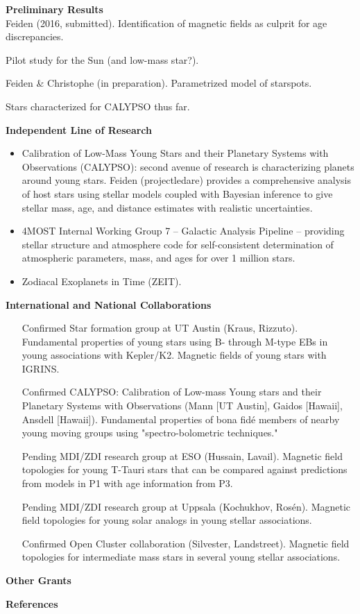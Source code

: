 \documentclass[12pt,a4paper]{article}
\begin{document}
{\bf \large Preliminary Results} \\
Feiden (2016, submitted). Identification of magnetic fields as culprit for age discrepancies.

Pilot study for the Sun (and low-mass star?).

Feiden \& Christophe (in preparation). Parametrized model of starspots.

Stars characterized for CALYPSO thus far.

{\bf \large Independent Line of Research}
\begin{itemize}
	\item Calibration of Low-Mass Young Stars and their Planetary Systems with Observations (CALYPSO): 
	second avenue of research is characterizing planets around young stars. 
    Feiden (projectledare) provides a comprehensive analysis of host stars using stellar models coupled 
    with Bayesian inference
    to give stellar mass, age, and distance estimates with realistic uncertainties.
	\item 4MOST Internal Working Group 7 -- Galactic Analysis Pipeline -- providing stellar
    structure and atmosphere code for self-consistent determination of atmospheric 
    parameters, mass, and ages for over 1 million stars.
    \item Zodiacal Exoplanets in Time (ZEIT).
\end{itemize}

{\bf \large International and National Collaborations}
\begin{itemize}
  	\item [Confirmed] Star formation group at UT Austin (Kraus, Rizzuto). Fundamental properties of young stars using B- through M-type EBs in young associations with Kepler/K2. Magnetic fields of young stars with IGRINS.
  	\item [Confirmed] CALYPSO: Calibration of Low-mass Young stars and their Planetary Systems with Observations (Mann [UT Austin], Gaidos [Hawaii], Ansdell [Hawaii]). Fundamental properties of bona fid\'{e} members of nearby young moving groups using "spectro-bolometric techniques."
  	\item [Pending] MDI/ZDI research group at ESO (Hussain, Lavail). Magnetic field topologies for young T-Tauri stars that can be compared against predictions from models in P1 with age information from P3.
  	\item [Pending] MDI/ZDI research group at Uppsala (Kochukhov, Ros\'{e}n). Magnetic field topologies for young solar analogs in young stellar associations.
  	\item [Confirmed] Open Cluster collaboration (Silvester, Landstreet). Magnetic field topologies for intermediate mass stars in several young stellar associations.
\end{itemize}


{\bf \large Other Grants}

{\bf \large References}
\scriptsize
\begingroup
\twocolumn


\endgroup
\end{document}
